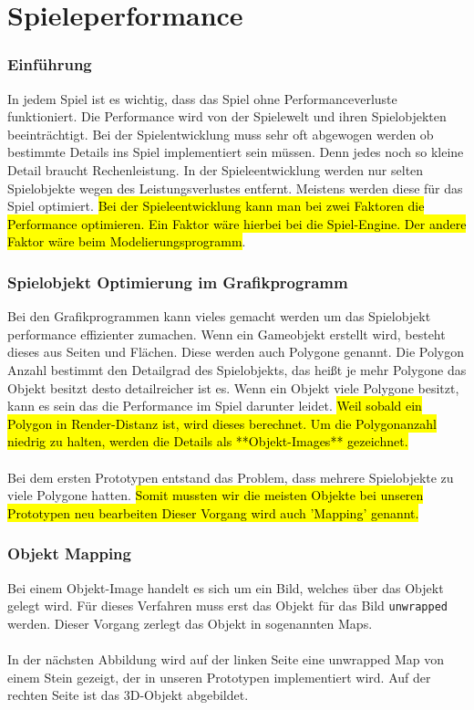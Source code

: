 
\pagebreak
{}
\chapter{Spieleperformance}


\subsection{Einführung}
In jedem Spiel ist es wichtig, dass das Spiel ohne Performanceverluste funktioniert. Die Performance wird von der Spielewelt und ihren Spielobjekten beeinträchtigt. Bei der Spielentwicklung muss sehr oft abgewogen werden ob bestimmte Details ins Spiel implementiert sein müssen. Denn jedes noch so kleine Detail braucht Rechenleistung. In der Spieleentwicklung werden nur selten Spielobjekte wegen des Leistungsverlustes entfernt. Meistens werden diese für das Spiel optimiert. \hl{Bei der Spieleentwicklung kann man bei zwei Faktoren die Performance optimieren. Ein Faktor wäre hierbei bei die Spiel-Engine. Der andere Faktor wäre beim Modelierungsprogramm}. %

\subsection{Spielobjekt Optimierung im Grafikprogramm}
Bei den Grafikprogrammen kann vieles gemacht werden um das Spielobjekt performance effizienter zumachen. Wenn ein Gameobjekt erstellt wird, besteht dieses aus Seiten und Flächen. Diese werden auch Polygone genannt. Die Polygon Anzahl bestimmt den Detailgrad des Spielobjekts, das heißt je mehr Polygone das Objekt besitzt desto detailreicher ist es. Wenn ein Objekt viele Polygone besitzt, kann es sein das die Performance im Spiel darunter leidet. \hl{Weil sobald ein Polygon in Render-Distanz ist, wird dieses berechnet. Um die Polygonanzahl niedrig zu halten, werden die Details als **Objekt-Images** gezeichnet.} \\\\
Bei dem ersten Prototypen entstand das Problem, dass mehrere Spielobjekte zu viele Polygone hatten. \hl{Somit mussten wir die meisten Objekte bei unseren Prototypen neu bearbeiten Dieser Vorgang wird auch 'Mapping' genannt.} %
\pagebreak
\subsection{Objekt Mapping}

Bei einem Objekt-Image handelt es sich um ein Bild, welches über das Objekt gelegt wird. Für dieses Verfahren muss erst das Objekt für das Bild \verb+unwrapped+ werden. Dieser Vorgang zerlegt das Objekt in sogenannten Maps.\\\\
In der nächsten Abbildung wird auf der linken Seite eine unwrapped Map von einem Stein gezeigt, der in unseren Prototypen implementiert wird. Auf der rechten Seite ist das 3D-Objekt abgebildet.


